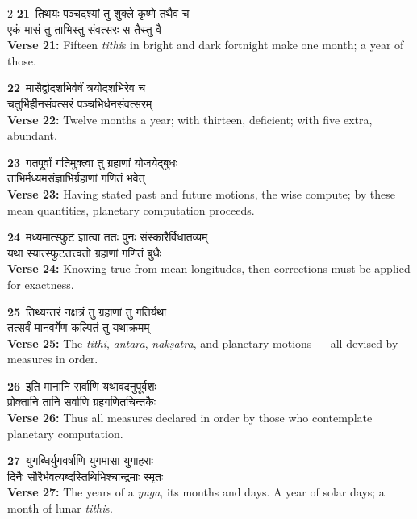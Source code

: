 \documentclass[11pt,a4paper]{article}
\newcommand{\dev}[1]{{\devanagarifont #1}}
\newcommand{\iast}[1]{\textit{#1}}
\newcommand{\vnum}[1]{\textcolor{versenumbercolor}{\textbf{#1}}}
\begin{document}
\begin{paracol}{2}
\switchcolumn[0]
\vnum{21}\ \dev{तिथयः पञ्चदश्यां तु शुक्ले कृष्णे तथैव च}\\
\dev{एकं मासं तु ताभिस्तु संवत्सरः स तैस्तु वै}\\
\switchcolumn[1]
\textbf{Verse 21:} Fifteen \iast{tithi}s in bright and dark fortnight make one month; a year of those.

\switchcolumn[0]
\vnum{22}\ \dev{मासैर्द्वादशभिर्वर्षं त्रयोदशभिरेव च}\\
\dev{चतुर्भिर्हीनसंवत्सरं पञ्चभिर्धनसंवत्सरम्}\\
\switchcolumn[1]
\textbf{Verse 22:} Twelve months a year; with thirteen, deficient; with five extra, abundant.

\switchcolumn[0]
\vnum{23}\ \dev{गतपूर्वां गतिमुक्त्वा तु ग्रहाणां योजयेद्बुधः}\\
\dev{ताभिर्मध्यमसंज्ञाभिर्ग्रहाणां गणितं भवेत्}\\
\switchcolumn[1]
\textbf{Verse 23:} Having stated past and future motions, the wise compute; by these mean quantities, planetary computation proceeds.

\switchcolumn[0]
\vnum{24}\ \dev{मध्यमात्स्फुटं ज्ञात्वा ततः पुनः संस्कारैर्विधातव्यम्}\\
\dev{यथा स्यात्स्फुटतत्त्वतो ग्रहाणां गणितं बुधैः}\\
\switchcolumn[1]
\textbf{Verse 24:} Knowing true from mean longitudes, then corrections must be applied for exactness.

\switchcolumn[0]
\vnum{25}\ \dev{तिथ्यन्तरं नक्षत्रं तु ग्रहाणां तु गतिर्यथा}\\
\dev{तत्सर्वं मानवर्गेण कल्पितं तु यथाक्रमम्}\\
\switchcolumn[1]
\textbf{Verse 25:} The \iast{tithi}, \iast{antara}, \iast{nak\d satra}, and planetary motions --- all devised by measures in order.

\switchcolumn[0]
\vnum{26}\ \dev{इति मानानि सर्वाणि यथावदनुपूर्वशः}\\
\dev{प्रोक्तानि तानि सर्वाणि ग्रहगणितचिन्तकैः}\\
\switchcolumn[1]
\textbf{Verse 26:} Thus all measures declared in order by those who contemplate planetary computation.

\switchcolumn[0]
\vnum{27}\ \dev{युगब्धिर्युगवर्षाणि युगमासा युगाहराः}\\
\dev{दिनैः सौरैर्भवत्यब्दस्तिथिभिश्चान्द्रमाः स्मृतः}\\
\switchcolumn[1]
\textbf{Verse 27:} The years of a \iast{yuga}, its months and days. A year of solar days; a month of lunar \iast{tithi}s.


\end{paracol}
\end{document}

